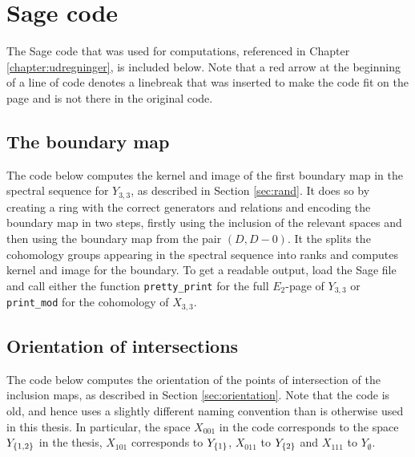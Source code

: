 
\chapter{Sage code} 
\label{appendix:sage}

The Sage code that was used for computations, referenced in Chapter
\ref{chapter:udregninger}, is included below. Note that a red arrow at
the beginning of a line of code denotes a linebreak that was inserted
to make the code fit on the page and is not there in the original
code.

\section{The boundary map}
\label{sec:sageboundary}

The code below computes the kernel and image of the first boundary map
in the spectral sequence for $Y_{3,3}$, as described in Section
\ref{sec:rand}. It does so by creating a ring with the correct
generators and relations and encoding the boundary map in two steps,
firstly using the inclusion of the relevant spaces and then using the
boundary map from the pair $(D,D-0)$. It the splits the cohomology
groups appearing in the spectral sequence into ranks and computes
kernel and image for the boundary. To get a readable output, load the
Sage file and call either the function \lstinline{pretty_print} for
the full $E_2$-page of $Y_{3,3}$ or \lstinline{print_mod} for the
cohomology of $X_{3,3}$.




\section{Orientation of intersections}
\label{sec:sageorientation}

The code below computes the orientation of the points of intersection
of the inclusion maps, as described in Section
\ref{sec:orientation}. Note that the code is old, and hence uses a
slightly different naming convention than is otherwise used in this
thesis. In particular, the space $X_{001}$ in the code corresponds to
the space $Y_{\left\{ 1,2 \right\}}$ in the thesis, $X_{101}$ corresponds to
$Y_{\left\{ 1 \right\}}$, $X_{011}$ to $Y_{\left\{ 2 \right\}}$ and $X_{111}$ to $Y_{\emptyset}$.




